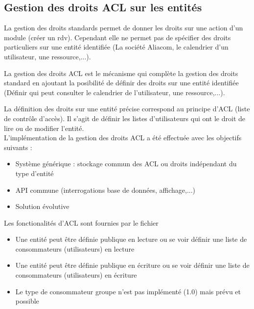 

\subsection{Gestion des droits ACL sur les entités}
\label{acl}

La gestion des droits standards permet de donner les droits sur une action d'un module (créer un rdv). Cependant elle ne permet pas de spécifier des droits particuliers sur une entité identifiée (La société Aliacom, le calendrier d'un utilisateur, une ressource,...). 

La gestion des droits ACL est le mécanisme qui complète la gestion des droits standard en ajoutant la posibilité de définir des droits sur une entité identifiée (Définir qui peut consulter le calendrier de l'utilisateur, une ressource,...).

La définition des droits sur une entité précise correspond au principe d'ACL (liste de contrôle d'accès).
Il s'agit de définir les listes d'utilisateurs qui ont le droit de lire ou de modifier l'entité.\\

L'implémentation de la gestion des droits ACL a été effectuée avec les objectifs suivants :\\
\begin{itemize}
\item Système générique : stockage commun des ACL ou droits indépendant du type d'entité
\item API commune (interrogations base de données, affichage,...)
\item Solution évolutive
\end{itemize}
\vspace{0.3cm}

Les fonctionalités d'ACL sont fournies par le fichier 

\begin{itemize}
\item Une entité peut être définie publique en lecture ou se voir définir une liste de consommateurs (utilisateurs) en lecture
\item Une entité peut être définie publique en écriture ou se voir définir une liste de consommateurs (utilisateurs) en écriture
\item Le type de consommateur groupe n'est pas implémenté (1.0) mais prévu et possible
\end{itemize}


